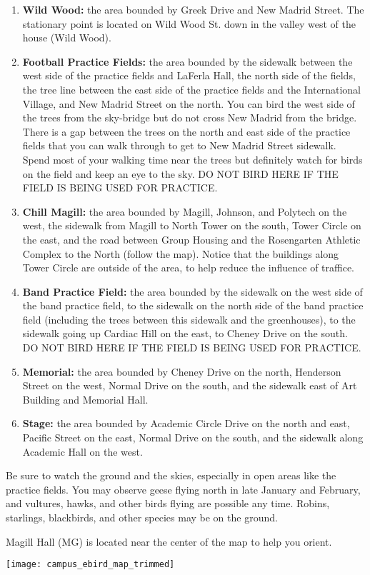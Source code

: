 \documentclass[12pt]{article}
\begin{document}
\begin{enumerate}
\item \textbf{Wild Wood:} the area bounded by Greek Drive and New Madrid Street. The stationary point is located on Wild Wood St. down in the valley west of the house (Wild Wood).

\item \textbf{Football Practice Fields:} the area bounded by the sidewalk between the west side of the practice fields and LaFerla Hall, the north side of the fields, the tree line between the east side of the practice fields and the International Village, and New Madrid Street on the north. You can bird the west side of the trees from the sky-bridge but do not cross New Madrid from the bridge. There is a gap between the trees on the north and east side of the practice fields that you can walk through to get to New Madrid Street sidewalk. Spend most of your walking time near the trees but definitely watch for birds on the field and keep an eye to the sky. DO NOT BIRD HERE IF THE FIELD IS BEING USED FOR PRACTICE.

\item \textbf{Chill Magill:} the area bounded by Magill, Johnson, and Polytech on the west, the sidewalk from Magill to North Tower on the south, Tower Circle on the east, and the road between Group Housing and the Rosengarten Athletic Complex to the North (follow the map). Notice that the buildings along Tower Circle are outside of the area, to help reduce the influence of traffice.

\item \textbf{Band Practice Field:} the area bounded by the sidewalk on the west side of the band practice field, to the sidewalk on the north side of the band practice field (including the trees between this sidewalk and the greenhouses), to the sidewalk going up Cardiac Hill on the east, to Cheney Drive on the south. DO NOT BIRD HERE IF THE FIELD IS BEING USED FOR PRACTICE.

\item \textbf{Memorial:} the area bounded by Cheney Drive on the north, Henderson Street on the west, Normal Drive on the south, and the sidewalk east of Art Building and Memorial Hall. 

\item \textbf{Stage:} the area bounded by Academic Circle Drive on the north and east, Pacific Street on the east, Normal Drive on the south, and the sidewalk along Academic Hall on the west. 
\end{enumerate}

Be sure to watch the ground and the skies, especially in open areas like the practice fields. You may observe geese flying north in late January and February, and vultures, hawks, and other birds flying are possible any time. Robins, starlings, blackbirds, and other species may be on the ground.


\newpage

Magill Hall (MG) is located near the center of the map to help you orient.

\texttt{[image: campus\_ebird\_map\_trimmed]}
\end{document}
